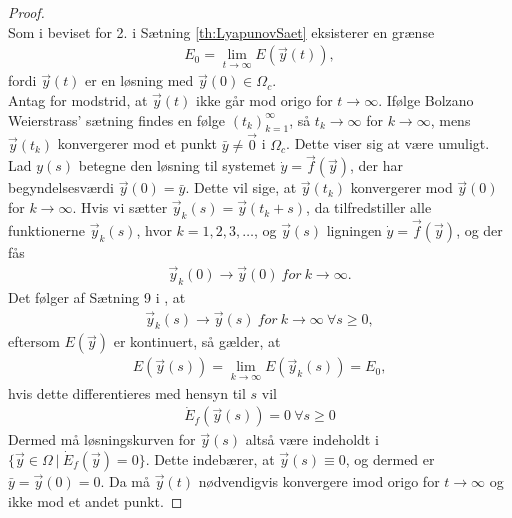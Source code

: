\begin{proof}\\
Som i beviset for 2. i Sætning \ref{th:LyapunovSaet} eksisterer en grænse
\begin{align*}
    E_0=\lim_{t\to \infty} E(\vec{y}(t)),
\end{align*}
fordi $\vec{y}(t)$ er en løsning med $\vec{y}(0)\in \Omega_c$.\\
\hfill \break
Antag  for modstrid, at $\vec{y}(t)$ ikke går mod origo for $t\to \infty$. Ifølge Bolzano Weierstrass' sætning \citep[s. 322]{Svensk}  findes en følge $(t_k)_{k=1}^\infty$, så $t_k\to \infty$ for $k\to \infty$, mens $\vec{y}(t_k)$ konvergerer mod et punkt $\bar{y}\neq \vec{0}$ i $\Omega_c$. Dette viser sig at være umuligt.\\
\hfill \break
Lad $y(s)$ betegne den løsning til systemet $\dot{y}=\vec{f}(\vec{y})$, der har begyndelsesværdi $\vec{y}(0)=\bar{y}$. Dette vil sige, at $\vec{y}(t_k)$ konvergerer mod $\vec{y}(0)$ for $k \to \infty$. Hvis vi sætter $\vec{y}_k(s)=\vec{y}(t_k+s)$, da tilfredstiller alle funktionerne $\vec{y}_k(s)$, hvor $k=1,2,3,\hdots$, og $\vec{y}(s)$ ligningen $\dot{y}=\vec{f}(\vec{y})$, og der fås 
\begin{align*}
    \vec{y}_k(0)\to \vec{y}(0) \ for \ k \to \infty.
\end{align*}
Det følger af Sætning 9 i \citep[s. 63]{Svensk}, at
\begin{align*}
    \vec{y}_k(s)\to \vec{y}(s) \ for \ k \to \infty \ \forall s \geq 0,
\end{align*}
eftersom $E(\vec{y})$ er kontinuert, så gælder, at 
\begin{align*}
    E(\vec{y}(s))=\lim_{k\to \infty}E(\vec{y}_k(s))=E_0,
\end{align*}
hvis dette differentieres med hensyn til $s$ vil 
\begin{align*}
    \dot{E}_f(\vec{y}(s))=0 \ \forall s \geq 0
\end{align*}
Dermed må løsningskurven for $\vec{y}(s)$ altså være indeholdt i $\{\vec{y}\in \Omega \ | \ \dot{E}_f(\vec{y})=0 \}$. Dette indebærer, at $\vec{y}(s)\equiv 0$, og dermed er $\bar{y}=\vec{y}(0)=0$. Da må $\vec{y}(t)$ nødvendigvis konvergere imod origo for $t \to \infty$ og ikke mod et andet punkt.
\end{proof}

